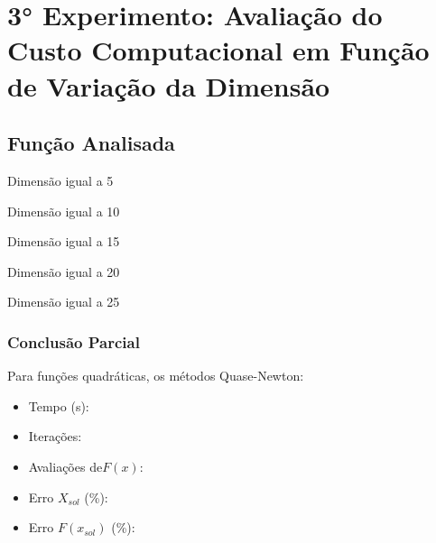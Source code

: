 

\section{3° Experimento: Avaliação do Custo Computacional em Função de Variação da Dimensão}
    \subsection{Função Analisada}

        \begin{minipage}[h!]{\linewidth}
            \centering
            Dimensão igual a 5
            \label{tab:tblo} 
            \writetable{\tblo}\par
            \bigskip
            \centering
            Dimensão igual a 10
            \label{tab:tblp} 
            \writetable{\tblp}\par
            \bigskip
            \centering
            Dimensão igual a 15
            \label{tab:tblq} 
            \writetable{\tblq}\par
            \bigskip
            \centering
            Dimensão igual a 20
            \label{tab:tblr} 
            \writetable{\tblr}\par
            \bigskip
            \centering
            Dimensão igual a 25
            \label{tab:tbls} 
            \writetable{\tbls}
        \end{minipage}

        \subsubsection{Conclusão Parcial}
            Para funções quadráticas, os métodos Quase-Newton:
            \begin{itemize}
            \item {Tempo (s):} 
            \item {Iterações:} 
            \item {Avaliações de$F(x)$:} 
            \item {Erro $X_{sol}$ (\%):} 
            \item {Erro $F(x_{sol})$ (\%):} 
            \end{itemize}
    
\newpage